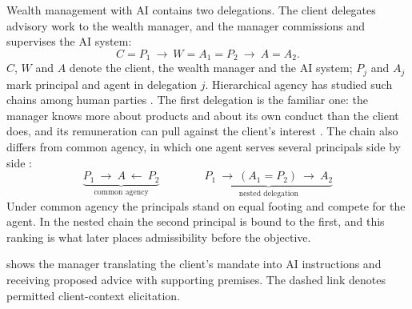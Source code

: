 \documentclass[oneside,10pt,english]{swissi}
\begin{document}
Wealth management with AI contains two delegations. The client delegates advisory work to the wealth manager, and the manager commissions and supervises the AI system:
\begin{equation}
 C=P_1\ \longrightarrow\ W=A_1=P_2\ \longrightarrow\ A=A_2.
 \label{eq:nested-delegation}
\end{equation}
$C$, $W$ and $A$ denote the client, the wealth manager and the AI system; $P_j$ and $A_j$ mark principal and agent in delegation $j$. Hierarchical agency has studied such chains among human parties \parencite{tirole1986hierarchies}. The first delegation is the familiar one: the manager knows more about products and about its own conduct than the client does, and its remuneration can pull against the client's interest \parencite{stoughton1993moral,inderst2009misselling}. The chain also differs from common agency, in which one agent serves several principals side by side \parencite{bernheim1986common}:
\begin{equation}
 \underbrace{P_1\ \longrightarrow\ A\ \longleftarrow\ P_2}_{\text{common agency}}
 \qquad\qquad
 \underbrace{P_1\ \longrightarrow\ (A_1=P_2)\ \longrightarrow\ A_2}_{\text{nested delegation}}
 \label{eq:common-nested}
\end{equation}
Under common agency the principals stand on equal footing and compete for the agent. In the nested chain the second principal is bound to the first, and this ranking is what later places admissibility before the objective.

 shows the manager translating the client's mandate into AI instructions and receiving proposed advice with supporting premises. The dashed link denotes permitted client-context elicitation.


\end{document}
